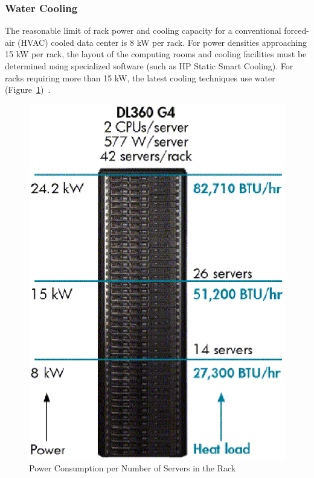             \subsubsection*{Water Cooling}
                The reasonable limit of rack power and cooling capacity for a conventional forced-air (HVAC) cooled data center is 8 kW per rack. For power densities approaching 15 kW per rack, the layout of the computing rooms and cooling facilities must be determined using specialized software (such as HP Static Smart Cooling). For racks requiring more than 15 kW, the latest cooling techniques use water (Figure~\ref{fig:power_consumption_number_servers_rack})~\cite{HPCooling07}.
                \begin{figure}[h!tb]
                    \centering
                    \includegraphics[scale=0.5]{graphics/power_consumption_number_servers_rack}
                    \caption{Power Consumption per Number of Servers in the Rack}
                    \label{fig:power_consumption_number_servers_rack}
                \end{figure}
                
